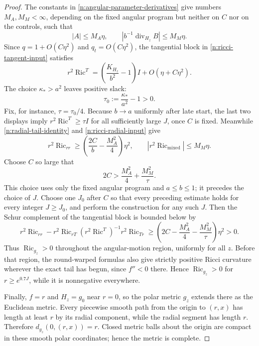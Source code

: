 \begin{proof}
The constants in \eqref{n:angular-parameter-derivatives} give numbers
$M_A,M_M<\infty$, depending on the fixed angular program but neither on
$C$ nor on the controls, such that
\[
 |A|\le M_A\eta,\qquad
 |b^{-1}\operatorname{div}_{H_z}B|\le M_M\eta.
\]
Since $q=1+O(C\eta^2)$ and $q_t=O(C\eta^2)$, the tangential block in
\eqref{n:ricci-tangent-input} satisfies
\[
 r^2\operatorname{Ric}^{T}
   =\left(\frac{K_{H_z}}{b^2}-1\right)I
      +O(\eta+C\eta^2).
\]
The choice $\kappa_*>a^2$ leaves positive slack:
\[
 \tau_0:=\frac{\kappa_*}{a^2}-1>0.
\]
Fix, for instance, $\tau=\tau_0/4$.  Because $b\to a$ uniformly after
late start, the last two displays imply
$r^2\operatorname{Ric}^{T}\ge\tau I$ for all sufficiently large $J$,
once $C$ is fixed.  Meanwhile \eqref{n:radial-tail-identity} and
\eqref{n:ricci-radial-input} give
\[
 r^2\operatorname{Ric}_{rr}
   \ge\left(\frac{2C}{b}-\frac{M_A^2}{4}\right)\eta^2,
 \qquad
 |r^2\operatorname{Ric}_{\mathrm{mixed}}|\le M_M\eta.
\]
Choose $C$ so large that
\begin{equation}
 2C>\frac{M_A^2}{4}+\frac{M_M^2}{\tau}.
 \label{n:ricci-schur-choice}
\end{equation}
This choice uses only the fixed angular program and $a\le b\le1$;
it precedes the choice of $J$.  Choose one $J_0$ after $C$ so that every preceding estimate holds
for every integer $J\ge J_0$, and perform the construction for any such
$J$. Then the Schur complement of the tangential block is bounded below by
\[
 r^2\operatorname{Ric}_{rr}
 -r^2\operatorname{Ric}_{rT}
       (r^2\operatorname{Ric}^{T})^{-1}
       r^2\operatorname{Ric}_{Tr}
 \ge
 \left(2C-\frac{M_A^2}{4}-\frac{M_M^2}{\tau}\right)\eta^2>0.
\]
Thus $\operatorname{Ric}_{g_z}>0$ throughout the angular-motion region,
uniformly for all $z$. Before that region, the round-warped formulas also
give strictly positive Ricci curvature wherever the exact tail has begun,
since $f''<0$ there. Hence $\operatorname{Ric}_{g_z}>0$ for
$r\ge e^{0.7J}$, while it is nonnegative everywhere.

Finally, $f=r$ and $H_z=g_0$ near $r=0$, so
the polar metric $g_z$ extends there as the Euclidean metric.  Every
piecewise smooth path from the origin to $(r,x)$ has length at least $r$
by its radial component, while the radial segment has length $r$.
Therefore $d_{g_z}(0,(r,x))=r$.  Closed metric balls about the origin are
compact in these smooth polar coordinates; hence the metric is complete.
\end{proof}


